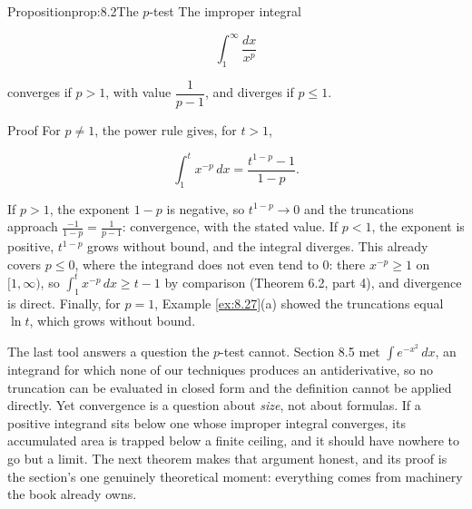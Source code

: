 \documentclass[a4paper,12pt,oneside]{memoir}
\begin{document}
\begin{envproposition}{Proposition}{prop:8.2}{The \(p\)-test}
The improper integral

\[ \int_{1}^{\infty} \frac{dx}{x^{p}} \]

converges if \(p > 1\), with value \(\dfrac{1}{p - 1}\), and diverges if \(p \le 1\).
\end{envproposition}
\begin{envproof}{Proof}{}{}
For \(p \ne 1\), the power rule gives, for \(t > 1\),

\[ \int_{1}^{t} x^{-p}\,dx = \frac{t^{1 - p} - 1}{1 - p}. \]

If \(p > 1\), the exponent \(1 - p\) is negative, so \(t^{1-p} \to 0\) and the truncations approach \(\tfrac{-1}{1 - p} = \tfrac{1}{p - 1}\): convergence, with the stated value. If \(p < 1\), the exponent is positive, \(t^{1-p}\) grows without bound, and the integral diverges. This already covers \(p \le 0\), where the integrand does not even tend to \(0\): there \(x^{-p} \ge 1\) on \([1, \infty)\), so \(\int_{1}^{t} x^{-p}\,dx \ge t - 1\) by comparison (Theorem 6.2, part 4), and divergence is direct. Finally, for \(p = 1\), Example \ref{ex:8.27}(a) showed the truncations equal \(\ln t\), which grows without bound. \qedmark
\end{envproof}
The last tool answers a question the \(p\)-test cannot. Section 8.5 met \(\int e^{-x^{2}}\,dx\), an integrand for which none of our techniques produces an antiderivative, so no truncation can be evaluated in closed form and the definition cannot be applied directly. Yet convergence is a question about \emph{size}, not about formulas. If a positive integrand sits below one whose improper integral converges, its accumulated area is trapped below a finite ceiling, and it should have nowhere to go but a limit. The next theorem makes that argument honest, and its proof is the section’s one genuinely theoretical moment: everything comes from machinery the book already owns.
\end{document}
